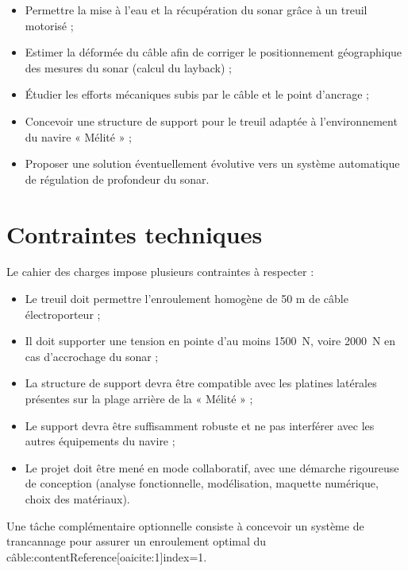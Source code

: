 \documentclass[12pt,a4paper]{report}
\begin{document}
\begin{itemize}

  \item Permettre la mise à l’eau et la récupération du sonar grâce à un treuil motorisé ;
  \item Estimer la déformée du câble afin de corriger le positionnement géographique des mesures du sonar
  (calcul du layback) ;
  \item Étudier les efforts mécaniques subis par le câble et le point d’ancrage ;
  \item Concevoir une structure de support pour le treuil adaptée à l’environnement du navire « Mélité » ;
  \item Proposer une solution éventuellement évolutive vers un système automatique de régulation de profondeur du sonar.

\end{itemize}

\section{Contraintes techniques}


Le cahier des charges impose plusieurs contraintes à respecter :

\begin{itemize}
  \item Le treuil doit permettre l’enroulement homogène de 50 m de câble électroporteur ;
  \item Il doit supporter une tension en pointe d’au moins 1500~N, voire 2000~N en cas d’accrochage du sonar ;
  \item La structure de support devra être compatible avec les platines latérales présentes sur la plage arrière de la
  « Mélité » ;
  \item Le support devra être suffisamment robuste et ne pas interférer avec les autres équipements du navire ;
  \item Le projet doit être mené en mode collaboratif, avec une démarche rigoureuse de conception
  (analyse fonctionnelle, modélisation, maquette numérique, choix des matériaux).

\end{itemize}


Une tâche complémentaire optionnelle consiste à concevoir un système de trancannage pour assurer un enroulement
optimal du câble:contentReference[oaicite:1]{index=1}.

\newpage

\end{document}
